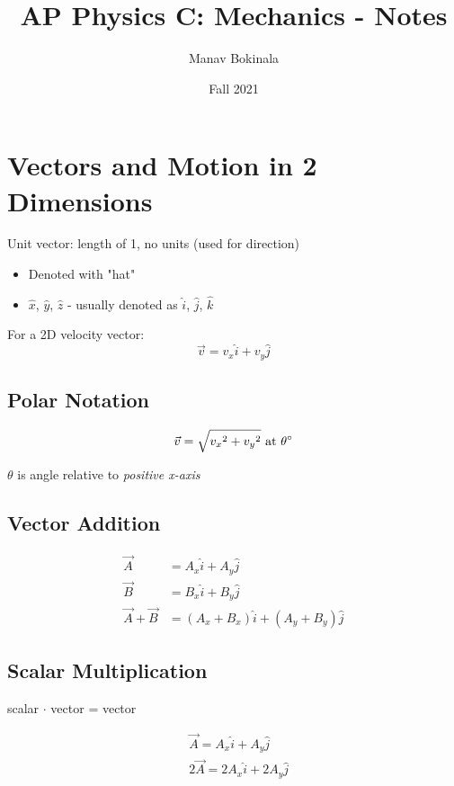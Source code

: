 \documentclass[titlepage]{article}
\title{AP Physics C: Mechanics - Notes}
\author{Manav Bokinala}
\date{Fall 2021}
\begin{document}
\maketitle

\newpage
\tableofcontents
\newpage

\section{Vectors and Motion in 2 Dimensions}
Unit vector: length of 1, no units (used for direction)

\begin{itemize}
    \item Denoted with "hat"
    \item $\hat{x}$, $\hat{y}$, $\hat{z}$ - usually denoted as $\hat{i}$, $\hat{j}$, $\hat{k}$
\end{itemize}

For a 2D velocity vector:
\[ \vec{v} = v_x \hat{i} + v_y \hat{j} \]

\subsection{Polar Notation}
\[ \vec{v} = \sqrt{{v_x}^2 + {v_y}^2} \text{ at } \theta \degree \]

$\theta$ is angle relative to \emph{positive x-axis}

\subsection{Vector Addition}
\begin{align*}
    \vec{A}           & = A_x \hat{i} + A_y \hat{j}                 \\
    \vec{B}           & = B_x \hat{i} + B_y \hat{j}                 \\
    \vec{A} + \vec{B} & = (A_x + B_x) \hat{i} + (A_y + B_y) \hat{j}
\end{align*}

\subsection{Scalar Multiplication}
scalar $\cdot$ vector = vector

\begin{align*}
     & \vec{A} = A_x \hat{i} + A_y \hat{j}    \\
     & 2\vec{A} = 2A_x \hat{i} + 2A_y \hat{j}
\end{align*}
\end{document}
